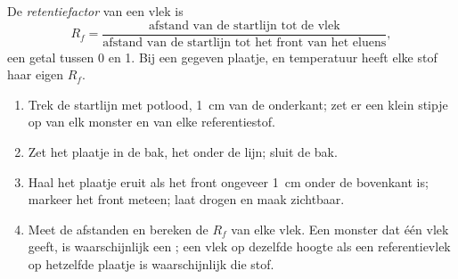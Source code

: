 \begin{definition}[Retentiefactor]\label{def:g10:chemical-species:retention-factor}
De \emph{retentiefactor} van een vlek is
\[
  R_f = \frac{\text{afstand van de startlijn tot de vlek}}
             {\text{afstand van de startlijn tot het front van het eluens}},
\]
een getal tussen 0 en 1. Bij een gegeven plaatje,  en temperatuur
heeft elke stof haar eigen $R_f$.
\end{definition}

\begin{method}\label{met:g10:chemical-species:tlc}
\begin{enumerate}
  \item Trek de startlijn met potlood, \qty{1}{cm} van de onderkant; zet
        er een klein stipje op van elk monster en van elke
        referentiestof.
  \item Zet het plaatje in de bak, het  onder de lijn; sluit de
        bak.
  \item Haal het plaatje eruit als het front ongeveer \qty{1}{cm} onder
        de bovenkant is; markeer het front meteen; laat drogen en maak
        zichtbaar.
  \item Meet de afstanden en bereken de $R_f$ van elke vlek. Een monster
        dat één vlek geeft, is waarschijnlijk een ; een vlek
        op dezelfde hoogte als een referentievlek op hetzelfde plaatje is
        waarschijnlijk die stof.
\end{enumerate}
\end{method}

